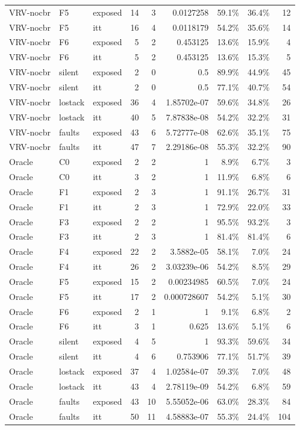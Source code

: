 \begin{tabular}{lllrrrrrr}
VRV-nocbr & F5 & exposed & 14 & 3 & 0.0127258 & 59.1\% & 36.4\% & 12 \\
VRV-nocbr & F5 & itt & 16 & 4 & 0.0118179 & 54.2\% & 35.6\% & 14 \\
VRV-nocbr & F6 & exposed & 5 & 2 & 0.453125 & 13.6\% & 15.9\% & 4 \\
VRV-nocbr & F6 & itt & 5 & 2 & 0.453125 & 13.6\% & 15.3\% & 5 \\
VRV-nocbr & silent & exposed & 2 & 0 & 0.5 & 89.9\% & 44.9\% & 45 \\
VRV-nocbr & silent & itt & 2 & 0 & 0.5 & 77.1\% & 40.7\% & 54 \\
VRV-nocbr & lostack & exposed & 36 & 4 & 1.85702e-07 & 59.6\% & 34.8\% & 26 \\
VRV-nocbr & lostack & itt & 40 & 5 & 7.87838e-08 & 54.2\% & 32.2\% & 31 \\
VRV-nocbr & faults & exposed & 43 & 6 & 5.72777e-08 & 62.6\% & 35.1\% & 75 \\
VRV-nocbr & faults & itt & 47 & 7 & 2.29186e-08 & 55.3\% & 32.2\% & 90 \\
Oracle & C0 & exposed & 2 & 2 & 1 & 8.9\% & 6.7\% & 3 \\
Oracle & C0 & itt & 3 & 2 & 1 & 11.9\% & 6.8\% & 6 \\
Oracle & F1 & exposed & 2 & 3 & 1 & 91.1\% & 26.7\% & 31 \\
Oracle & F1 & itt & 2 & 3 & 1 & 72.9\% & 22.0\% & 33 \\
Oracle & F3 & exposed & 2 & 2 & 1 & 95.5\% & 93.2\% & 3 \\
Oracle & F3 & itt & 2 & 3 & 1 & 81.4\% & 81.4\% & 6 \\
Oracle & F4 & exposed & 22 & 2 & 3.5882e-05 & 58.1\% & 7.0\% & 24 \\
Oracle & F4 & itt & 26 & 2 & 3.03239e-06 & 54.2\% & 8.5\% & 29 \\
Oracle & F5 & exposed & 15 & 2 & 0.00234985 & 60.5\% & 7.0\% & 24 \\
Oracle & F5 & itt & 17 & 2 & 0.000728607 & 54.2\% & 5.1\% & 30 \\
Oracle & F6 & exposed & 2 & 1 & 1 & 9.1\% & 6.8\% & 2 \\
Oracle & F6 & itt & 3 & 1 & 0.625 & 13.6\% & 5.1\% & 6 \\
Oracle & silent & exposed & 4 & 5 & 1 & 93.3\% & 59.6\% & 34 \\
Oracle & silent & itt & 4 & 6 & 0.753906 & 77.1\% & 51.7\% & 39 \\
Oracle & lostack & exposed & 37 & 4 & 1.02584e-07 & 59.3\% & 7.0\% & 48 \\
Oracle & lostack & itt & 43 & 4 & 2.78119e-09 & 54.2\% & 6.8\% & 59 \\
Oracle & faults & exposed & 43 & 10 & 5.55052e-06 & 63.0\% & 28.3\% & 84 \\
Oracle & faults & itt & 50 & 11 & 4.58883e-07 & 55.3\% & 24.4\% & 104 \\
\bottomrule
\end{tabular}

